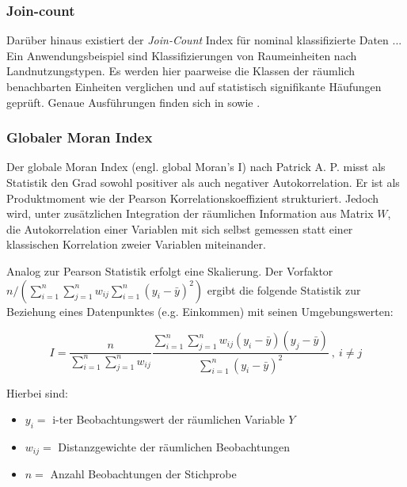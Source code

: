 \subsubsection{Join-count}
Darüber hinaus existiert der \emph{Join-Count} Index für nominal klassifizierte Daten ...
Ein Anwendungsbeispiel sind Klassifizierungen von Raumeinheiten nach Landnutzungstypen. 
Es werden hier paarweise die Klassen der räumlich benachbarten Einheiten verglichen und auf statistisch signifikante Häufungen geprüft.
Genaue Ausführungen finden sich in \cite[S. 19]{schabenberger_statistical_2005} sowie \cite[S.263]{fischer_handbook_2010}.

\subsubsection{Globaler Moran Index}
Der globale Moran Index (engl. global Moran’s I) nach Patrick A. P. \cite{moran_notes_1950} 
misst als Statistik den Grad sowohl positiver als auch negativer Autokorrelation. 
Er ist als Produktmoment wie der Pearson Korrelationskoeffizient strukturiert. 
Jedoch wird, unter zusätzlichen Integration der räumlichen Information aus Matrix $W$, 
die Autokorrelation einer Variablen mit sich selbst gemessen statt einer klassischen Korrelation zweier Variablen miteinander. 

\begin{definition} \label{def:global-moran}
    Analog zur Pearson Statistik erfolgt eine Skalierung. 
    Der Vorfaktor  $n \big/ \left( \sum_{i=1}^{n} \sum_{j=1}^{n} w_{ij} \sum_{i=1}^{n} \left(y_i-\bar{y}\right)^2 \right) $ 
    ergibt die folgende Statistik zur Beziehung eines Datenpunktes (e.g. Einkommen) mit seinen Umgebungswerten: \cite[S.22]{moran_notes_1950}
    
\begin{equation}
    I=\frac{n}{\sum_{i=1}^{n}\sum_{j=1}^{n} w_{ij}} 
        \frac{\sum_{i=1}^{n}\sum_{j=1}^{n}{w_{ij} \left( y_i-\bar{y} \right) \left( y_j-\bar{y} \right) }}  
        {\sum_{i=1}^{n} \left( y_i-\bar{y} \right)^2} ~ , ~ i \neq j
\end{equation}

Hierbei sind: 
\begin{itemize}
    \item $y_i=$ i-ter Beobachtungswert der räumlichen Variable $Y$
    \item $w_{ij}=$ Distanzgewichte der räumlichen Beobachtungen
    \item $n=$ Anzahl Beobachtungen der Stichprobe
\end{itemize}

\end{definition}


